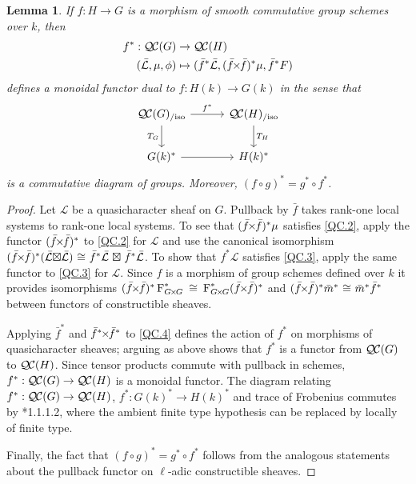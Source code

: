 \documentclass[10pt]{amsart}
\theoremstyle{plain}
\newtheorem{lemma}[theorem]{Lemma}
\theoremstyle{definition}
\theoremstyle{remark}
\newcommand{\Fq}{k}
\newcommand{\Frob}[1]{\operatorname{F}_{#1}}
\newcommand{\iso}{{\ \cong\ }}
\newcommand{\TrFrob}[1]{T_{#1}}
\newcommand{\qcs}[1]{{\mathcal{#1}}}
\newcommand{\gqcs}[1]{{\mathcal{\bar #1}}}
\newcommand{\QC}{{\mathcal{Q\hskip-0.8pt C}}}
\newcommand{\QCiso}[1]{\QC(#1)_{/\text{iso}}}
\renewcommand{\bf}{\bar{f}}
\newcommand{\bm}{\bar{m}}
\newcommand{\tight}[3]{\hspace{-#1pt}{#2}\hspace{-#3pt}}
\newcommand{\bfxf}{\text{$\bar{f} \tight{1}{\times}{1} \bar{f}$}}
\newcommand{\GxxG}{\text{$G \tight{1}{\times}{1} G$}}
\newcommand{\LxL}{\text{$\gqcs{L} \tight{0}{\boxtimes}{0} \gqcs{L}$}}
\begin{document}
\begin{lemma}\label{lem:pullback}
  If $f : H\to G$ is a morphism of smooth commutative group schemes over $\Fq$, then
  \begin{align*}
  f^* : \QC(G) &\to \QC(H) \\
  (\gqcs{L},\mu,\phi) &\mapsto (\bf^*\gqcs{L},(\bfxf)^*\mu,\bf^*F)
  \end{align*}
  defines a monoidal functor dual to $f \colon H(\Fq) \to G(\Fq)$ in the sense that
  \[
  \begin{tikzcd}[row sep=20, column sep=30]
   \QCiso{G} \rar{f^*} \arrow[swap]{d}{\TrFrob{G}} & \QCiso{H} \dar{\TrFrob{H}} \\
   G(\Fq)^* \rar & H(\Fq)^*
  \end{tikzcd}
  \]
  is a commutative diagram of groups.  Moreover, $(f\circ g)^* = g^* \circ f^*$.
\end{lemma}
\begin{proof}
  Let $\qcs{L}$ be a quasicharacter sheaf on $G$. 
  Pullback by $\bf$ takes rank-one local systems to rank-one local systems.
  To see that $(\bfxf)^* \mu$ satisfies \ref{QC.2},
  apply the functor $(\bfxf)^*$
  to \ref{QC.2} for $\qcs{L}$ and use the canonical isomorphism
  $(\bfxf)^*(\LxL) \iso \bf^*\gqcs{L} \tight{-3}{\boxtimes}{-3} \bf^*\gqcs{L}$.
  To show that $f^*\qcs{L}$ satisfies
  \ref{QC.3}, apply the same functor to \ref{QC.3} for $\qcs{L}$.
  Since $f$ is a morphism of group schemes defined over $\Fq$
  it provides isomorphisms $(\bfxf)^*\Frob{\GxxG}^* \iso \Frob{\GxxG}^* (\bfxf)^*$
  and $(\bfxf)^* \bm^*\iso \bm^* \bf^*$ between functors of constructible sheaves.

  Applying $\bf^*$ and $\bf^* \tight{1}{\times}{1}\bf^*$ to \ref{QC.4} defines the action
  of $f^*$ on morphisms of quasicharacter sheaves; arguing as above shows that $f^*$ is
  a functor from $\QC(G)$ to $\QC(H)$.  Since tensor products commute with pullback in schemes,
  $f^* : \QC(G) \to \QC(H)$ is a monoidal functor.
  The diagram relating $f^* : \QC(G) \to \QC(H)$, $f^* : G(k)^* \to H(k)^*$ and trace of Frobenius
  commutes by \cite{laumon:87a}*{1.1.1.2}, where the ambient
 finite type hypothesis can be replaced by locally of finite type.

  Finally, the fact that $(f\circ g)^* = g^* \circ f^*$ follows from the analogous
  statements about the pullback functor on $\ell$-adic constructible sheaves.
\end{proof}
\end{document}
